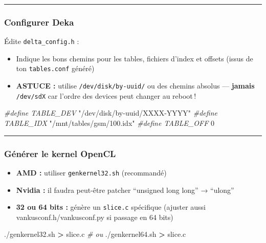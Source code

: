 \documentclass[
  french,
]{article}
\newenvironment{Shaded}{\begin{snugshade}}{\end{snugshade}}
\newcommand{\CommentTok}[1]{\textcolor[rgb]{0.56,0.35,0.01}{\textit{#1}}}
\newcommand{\DecValTok}[1]{\textcolor[rgb]{0.00,0.00,0.81}{#1}}
\newcommand{\ExtensionTok}[1]{#1}
\newcommand{\NormalTok}[1]{#1}
\newcommand{\OperatorTok}[1]{\textcolor[rgb]{0.81,0.36,0.00}{\textbf{#1}}}
\newcommand{\PreprocessorTok}[1]{\textcolor[rgb]{0.56,0.35,0.01}{\textit{#1}}}
\newcommand{\StringTok}[1]{\textcolor[rgb]{0.31,0.60,0.02}{#1}}
\providecommand{\tightlist}{%
  \setlength{\itemsep}{0pt}\setlength{\parskip}{0pt}}
\begin{document}
\begin{center}\rule{0.5\linewidth}{0.5pt}\end{center}

\subsubsection{Configurer Deka}\label{configurer-deka}

Édite \texttt{delta\_config.h} :

\begin{itemize}
\tightlist
\item
  Indique les bons chemins pour les tables, fichiers d'index et offsets
  (issus de ton \texttt{tables.conf} généré)
\item
  \textbf{ASTUCE :} utilise \texttt{/dev/disk/by-uuid/} ou des chemins
  absolus --- \textbf{jamais} \texttt{/dev/sdX} car l'ordre des devices
  peut changer au reboot\,!
\end{itemize}

\begin{Shaded}
\begin{Highlighting}[]
\PreprocessorTok{\#define TABLE\_DEV }\StringTok{"/dev/disk/by{-}uuid/XXXX{-}YYYY"}
\PreprocessorTok{\#define TABLE\_IDX }\StringTok{"/mnt/tables/gsm/100.idx"}
\PreprocessorTok{\#define TABLE\_OFF }\DecValTok{0}
\end{Highlighting}
\end{Shaded}

\begin{center}\rule{0.5\linewidth}{0.5pt}\end{center}

\subsubsection{Générer le kernel
OpenCL}\label{guxe9nuxe9rer-le-kernel-opencl}

\begin{itemize}
\tightlist
\item
  \textbf{AMD :} utiliser \texttt{genkernel32.sh} (recommandé)
\item
  \textbf{Nvidia :} il faudra peut-être patcher ``unsigned long long'' →
  ``ulong''
\item
  \textbf{32 ou 64 bits :} génère un \texttt{slice.c} spécifique
  (ajuster aussi vankusconf.h/vankusconf.py si passage en 64 bits)
\end{itemize}

\begin{Shaded}
\begin{Highlighting}[]
\ExtensionTok{./genkernel32.sh} \OperatorTok{\textgreater{}}\NormalTok{ slice.c}
\CommentTok{\# ou}
\ExtensionTok{./genkernel64.sh} \OperatorTok{\textgreater{}}\NormalTok{ slice.c}
\end{Highlighting}
\end{Shaded}
\end{document}
